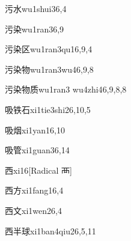 \begin{verbete}{污水}{wu1shui3}{6,4}
\end{verbete}

\begin{verbete}{污染}{wu1ran3}{6,9}
\end{verbete}

\begin{verbete}{污染区}{wu1ran3qu1}{6,9,4}
\end{verbete}

\begin{verbete}{污染物}{wu1ran3wu4}{6,9,8}
\end{verbete}

\begin{verbete}{污染物质}{wu1ran3 wu4zhi4}{6,9,8,8}
\end{verbete}

\begin{verbete}{吸铁石}{xi1tie3shi2}{6,10,5}
\end{verbete}

\begin{verbete}{吸烟}{xi1yan1}{6,10}
\end{verbete}

\begin{verbete}{吸管}{xi1guan3}{6,14}
\end{verbete}

\begin{verbete}{西}{xi1}{6}[Radical 襾]
\end{verbete}

\begin{verbete}{西方}{xi1fang1}{6,4}
\end{verbete}

\begin{verbete}{西文}{xi1wen2}{6,4}
\end{verbete}

\begin{verbete}{西半球}{xi1ban4qiu2}{6,5,11}
\end{verbete}

